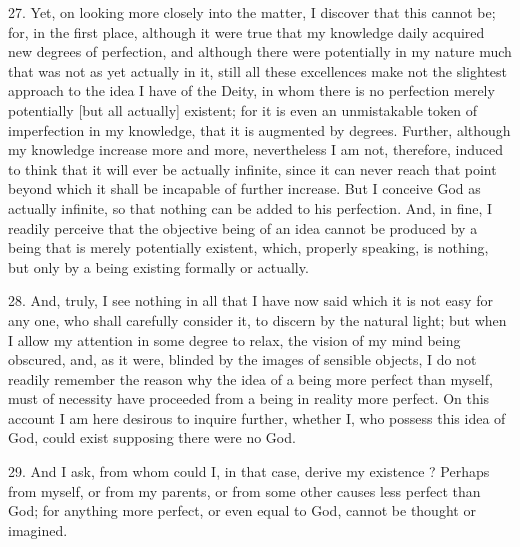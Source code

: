 27. Yet, on looking more closely into the matter, I discover that this cannot be; for, in the first place, although it were true that my knowledge daily acquired new degrees of perfection, and although there were potentially in my nature much that was not as yet actually in it, still all these excellences make not the slightest approach to the idea I have of the Deity, in whom there is no perfection merely potentially [but all actually] existent; for it is even an unmistakable token of imperfection in my knowledge, that it is augmented by degrees. Further, although my knowledge increase more and more, nevertheless I am not, therefore, induced to think that it will ever be actually infinite, since it can never reach that point beyond which it shall be incapable of further increase. But I conceive God as actually infinite, so that nothing can be added to his perfection. And, in fine, I readily perceive that the objective being of an idea cannot be produced by a being that is merely potentially existent, which, properly speaking, is nothing, but only by a being existing formally or actually.

28. And, truly, I see nothing in all that I have now said which it is not easy for any one, who shall carefully consider it, to discern by the natural light; but when I allow my attention in some degree to relax, the vision of my mind being obscured, and, as it were, blinded by the images of sensible objects, I do not readily remember the reason why the idea of a being more perfect than myself, must of necessity have proceeded from a being in reality more perfect. On this account I am here desirous to inquire further, whether I, who possess this idea of God, could exist supposing there were no God.

29. And I ask, from whom could I, in that case, derive my existence ? Perhaps from myself, or from my parents, or from some other causes less perfect than God; for anything more perfect, or even equal to God, cannot be thought or imagined.

